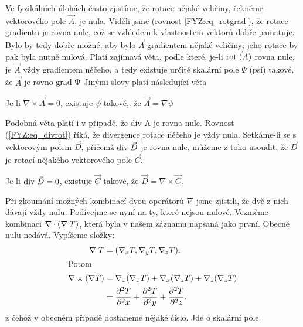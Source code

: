     Ve fyzikálních úlohách často zjistíme, že rotace nějaké veličiny, řekněme vektorového pole \(\vec{A}\), 
    je nula. Viděli jsme (rovnost \ref{FYZ:eq_rotgrad}), že rotace gradientu je rovna nule, což se vzhledem 
    k vlastnostem vektorů dobře pamatuje. Bylo by tedy dobře možné, aby bylo \(\vec{A}\) gradientem nějaké 
    veličiny; jeho rotace by pak byla nutně nulová. Platí zajímavá věta, podle které, je-li \(\mathrm{rot}\;\vec{(}A)\) 
    rovna nule, je \(\vec{A}\) vždy gradientem něčeho, a tedy existuje určité skalární pole \(\Psi\) (psí) 
    takové, že \(\vec{A}\) je rovno \(\mathrm{grad\;}\Psi\) Jinými slovy platí následující věta
    \begin{lemma}
      Je-li $\nabla\times\vec{A}=0$, existuje $\psi$ takové,. že $\vec{A} = \nabla\psi$
    \end{lemma}
    Podobná věta platí i v případě, že div A je rovna nule. Rovnost (\ref{FYZ:eq_divrot}) říká, že
    divergence rotace něčeho je vždy nula. Setkáme-li se s vektorovým polem \(\vec{D}\), přičemž 
    \(\mathrm{div}\;\vec{D}\) je rovna nule, můžeme z toho usoudit, že \(\vec{D}\) je rotací nějakého vektorového pole 
    \(\vec{C}\).
    \begin{lemma}
      Je-li $\mathrm{div}\;\vec{D} = 0$, existuje $\vec{C}$ takové, že $\vec{D} = \nabla\times\vec{C}$.
    \end{lemma}
    Při zkoumání možných kombinací dvou operátorů \(\nabla\) jsme zjistili, že dvě z nich dávají vždy nulu. 
    Podívejme se nyní na ty, které nejsou nulové. Vezměme kombinaci \(\nabla\cdot(\nabla\;T)\), která byla 
    v našem záznamu napsaná jako první. Obecně nulu nedává. Vypíšeme složky: 
    \begin{align*}
      \nabla\;T              &= (\nabla_xT, \nabla_yT, \nabla_zT).  \\
      \shortintertext{Potom}
      \nabla\times(\nabla T) &= \nabla_x(\nabla_xT) + \nabla_x(\nabla_zT) + \nabla_z(\nabla_zT)   \\
                             &= \frac{\partial^2 T}{\partial^2 x} + \frac{\partial^2 T}{\partial^2 y} + \frac{\partial^2 T}{\partial^2 z}.
    \end{align*}
    z čehož v obecném případě dostaneme nějaké číslo. Jde o skalární pole. 
  
